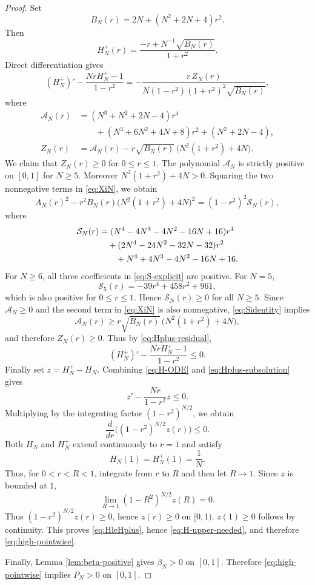 \documentclass[11pt,letterpaper]{amsart}
\theoremstyle{definition}
\theoremstyle{remark}
\numberwithin{equation}{section}
\begin{document}
\begin{proof}
Set
\[
 B_N(r)=2N+(N^2+2N+4)r^2.
\]
Then
\[
 H_N^+(r)=\frac{-r+N^{-1}\sqrt{B_N(r)}}{1+r^2}.
\]
Direct differentiation gives
\begin{equation}\label{eq:Hplus-residual}
 (H_N^+)'-\frac{NrH_N^+-1}{1-r^2}
 =-\frac{r\,Z_N(r)}{N(1-r^2)(1+r^2)^2\sqrt{B_N(r)}},
\end{equation}
where
\begin{align}
 \mathcal A_N(r)
 &=(N^3+N^2+2N-4)r^4\label{eq:AcalN}\\ 
 &\qquad+(N^3+6N^2+4N+8)r^2
 +(N^2+2N-4),\\
 Z_N(r)
 &=\mathcal A_N(r)
 -r\sqrt{B_N(r)}\,\bigl(N^2(1+r^2)+4N\bigr).\label{eq:XiN}
\end{align}
We claim that $Z_N(r) \geq 0$ for $0 \leq r \leq 1$.
The polynomial $\mathcal A_N$ is strictly positive on $[0,1]$ for $N\ge5$.  Moreover $N^2(1+r^2)+4N>0$. Squaring the two nonnegative terms in \eqref{eq:XiN}, we obtain 
\begin{equation}\label{eq:Sidentity}
 A_N(r)^2
 -r^2B_N(r)\bigl(N^2(1+r^2)+4N\bigr)^2
=(1-r^2)^2\mathcal S_N(r),
\end{equation}
where
\begin{align}
 \mathcal S_N(r)
 &=(N^4-4N^3-4N^2-16N+16)r^4 \notag\\
 &\quad +(2N^4-24N^2-32N-32)r^2
 \\
 &\qquad+N^4+4N^3-4N^2-16N+16.\label{eq:S-explicit}
\end{align}
For $N\ge6$, all three coefficients in \eqref{eq:S-explicit} are positive.  For $N=5$,
\[
 \mathcal S_5(r)=-39r^4+458r^2+961,
\]
which is also positive for $0\le r\le1$.  Hence $\mathcal S_N(r)\ge0$ for all $N\ge5$.  Since $\mathcal A_N\ge0$ and the second term in \eqref{eq:XiN} is also nonnegative, \eqref{eq:Sidentity} implies
\[
 \mathcal A_N(r)
 \ge r\sqrt{B_N(r)}\,\bigl(N^2(1+r^2)+4N\bigr),
\]
and therefore $Z_N(r)\ge0$.  Thus by \eqref{eq:Hplus-residual},
\begin{equation}\label{eq:Hplus-subsolution}
 (H_N^+)'-\frac{NrH_N^+-1}{1-r^2}\le0.
\end{equation}
Finally set $z=H_N^+-H_N$.  Combining \eqref{eq:H-ODE} and \eqref{eq:Hplus-subsolution} gives
\[
 z'-\frac{Nr}{1-r^2}z\le0.
\]
Multiplying by the integrating factor $(1-r^2)^{N/2}$, we obtain
\[
 \frac{d}{dr}\Big((1-r^2)^{N/2}z(r)\Big)\le0.
\]
Both $H_N$ and $H_N^+$ extend continuously to $r=1$ and satisfy
\[
 H_N(1)=H_N^+(1)=\frac1N.
\]
Thus, for $0<r<R<1$, integrate from $r$ to $R$ and then let $R\to 1$.  Since $z$ is bounded at $1$,
\[
 \lim_{R\to 1}(1-R^2)^{N/2}z(R)=0.
\]
Thus $(1-r^2)^{N/2}z(r)\ge0$, hence $z(r)\ge0$ on $[0,1)$. $z(1)\ge 0$ follows by continuity.  This proves \eqref{eq:HleHplus}, hence \eqref{eq:H-upper-needed}, and therefore \eqref{eq:high-pointwise}.  

Finally, Lemma \ref{lem:beta-positive} gives $\beta_N>0$ on $[0,1]$.  Therefore \eqref{eq:high-pointwise} implies $P_N>0$ on $[0,1]$.
\end{proof}
\end{document}
